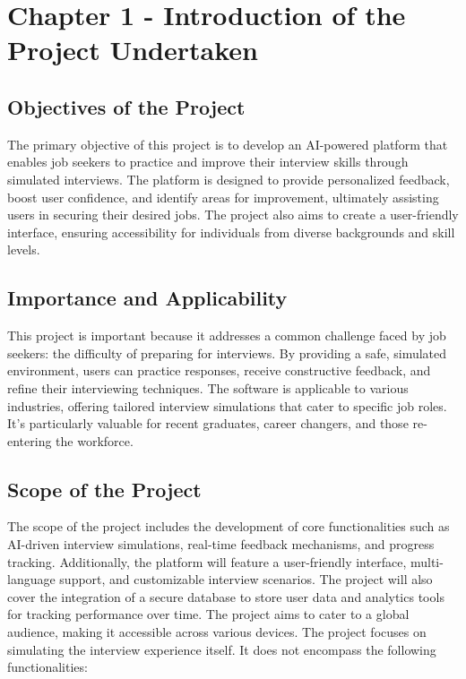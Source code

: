 \section{Chapter 1 - Introduction of the Project Undertaken}
\subsection{Objectives of the Project}
The primary objective of this project is to develop an AI-powered platform that enables job seekers to practice and improve their interview skills through simulated interviews. The platform is designed to provide personalized feedback, boost user confidence, and identify areas for improvement, ultimately assisting users in securing their desired jobs. The project also aims to create a user-friendly interface, ensuring accessibility for individuals from diverse backgrounds and skill levels.

\subsection{Importance and Applicability}
This project is important because it addresses a common challenge faced by job seekers: the difficulty of preparing for interviews. By providing a safe, simulated environment, users can practice responses, receive constructive feedback, and refine their interviewing techniques. The software is applicable to various industries, offering tailored interview simulations that cater to specific job roles. It’s particularly valuable for recent graduates, career changers, and those re-entering the workforce.

\subsection{Scope of the Project}
The scope of the project includes the development of core functionalities such as AI-driven interview simulations, real-time feedback mechanisms, and progress tracking. Additionally, the platform will feature a user-friendly interface, multi-language support, and customizable interview scenarios. The project will also cover the integration of a secure database to store user data and analytics tools for tracking performance over time. The project aims to cater to a global audience, making it accessible across various devices.
The project focuses on simulating the interview experience itself. It does not encompass the following functionalities:\\


